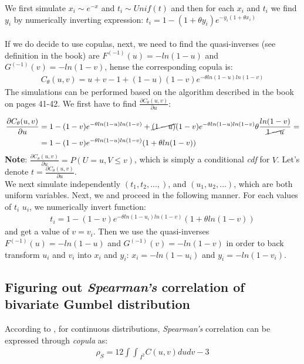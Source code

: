 \documentclass[]{article}
\begin{document}
 We first simulate $x_i \sim e^{-x}$ and $t_i \sim Unif(t)$ and then for each $x_i$ and $t_i$ we find $y_i$ by numerically inverting expression: $t_i = 1 - (1+\theta y_i)e^{-y_i(1+\theta x_i)}$ \\
~\\
If we do decide to use copulas, next, we need to find the quasi-inverses (see definition in the book) are $F^{(-1)}(u) = -ln (1-u)$ and $G^{(-1)}(v) = -ln (1-v)$, hense the corresponding copula is:
  $$
  \begin{aligned}
      C_{\theta}(u, v) = u+v-1+(1-u)(1-v)e^{-\theta ln(1-u) ln(1-v)}
  \end{aligned}
  $$
The simulations can be performed based on the algorithm described in the book on pages 41-42. We first have to find $\frac{\partial C_{\theta}(u, v)}{\partial u}$:

  $$
  \begin{aligned}
     \frac{\partial C_{\theta}(u, v)}{\partial u} &= 1-(1-v)e^{-\theta ln(1-u) ln(1-v)} + \cancel{(1-u)}(1-v)e^{-\theta ln(1-u) ln(1-v)} \theta \frac{ln(1-v)}{\cancel{1-u}} =\\
     &= 1 - (1-v)e^{-\theta ln(1-u) ln(1-v)}(1 + \theta ln(1-v))
  \end{aligned}
  $$
\textbf{Note}: $\frac{\partial C_{\theta}(u, v)}{\partial u} = P(U= u, V\leq v)$, which is simply a conditional \emph{cdf} for $V$. Let's denote $t=\frac{\partial C_{\theta}(u, v)}{\partial u}$.\\
We next simulate independently $(t_1, t_2, ..., )$, and $(u_1, u_2, ...)$, which are both uniform variables. Next, we and proceed in the following manner. For each values of $t_i$  $u_i$, we numerically invert function:
  $$
  \begin{aligned}
      t_i = 1 - (1-v)e^{-\theta ln(1-u_i) ln(1-v)}(1 + \theta ln(1-v))
  \end{aligned}
  $$
and get a value of $v=v_i$. Then we use the quasi-inverses $F^{(-1)}(u) = -ln (1-u)$ and $G^{(-1)}(v) = -ln (1-v)$ in order to back transform $u_i$ and $v_i$ into $x_i$ and $y_i$: $x_i = -ln (1-u_i)$ and $y_i = -ln (1-v_i)$.

\subsection{Figuring out \emph{Spearman's} correlation of bivariate Gumbel distribution}
According to \cite{nelsen2007introduction}, for continuous distributions, \emph{Spearman's} correlation can be expressed through \emph{copula} as:
	$$
	\begin{aligned}
		 \rho_S = 12{\int\int}_{I^2}C(u, v)dudv - 3
	\end{aligned}
	$$
  
\end{document}
